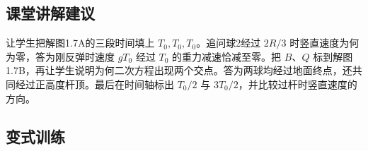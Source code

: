 \documentclass[UTF8,fontset=fandol,a4paper,11pt]{ctexart}
\begin{document}


\subsection*{课堂讲解建议}

让学生把解图1.7A的三段时间填上 $T_0,T_0,T_0$。追问球2经过 $2R/3$ 时竖直速度为何为零，答为刚反弹时速度 $gT_0$ 经过 $T_0$ 的重力减速恰减至零。把 $B$、$Q$ 标到解图1.7B，再让学生说明为何二次方程出现两个交点。答为两球均经过地面终点，还共同经过正高度杆顶。最后在时间轴标出 $T_0/2$ 与 $3T_0/2$，并比较过杆时竖直速度的方向。



\subsection*{变式训练}
\end{document}
